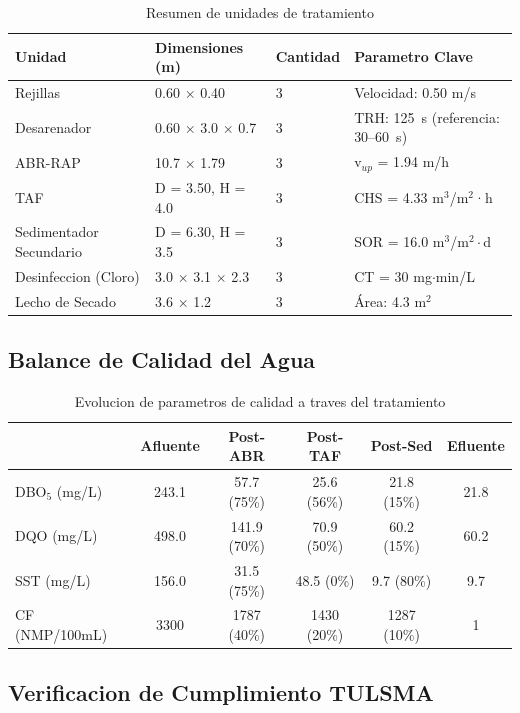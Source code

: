 \documentclass[12pt,a4paper]{article}
\begin{document}
\begin{table}[H]
\centering
\caption{Resumen de unidades de tratamiento}
\small
\begin{tabular}{p{3.2cm}p{3.5cm}p{1.5cm}p{4.8cm}}
\toprule
\textbf{Unidad} & \textbf{Dimensiones (m)} & \textbf{Cantidad} & \textbf{Parametro Clave} \\
\midrule
Rejillas & 0.60 $\times$ 0.40 & 3 & Velocidad: 0.50 m/s \\
Desarenador & 0.60 $\times$ 3.0 $\times$ 0.7 & 3 & TRH: 125~s (referencia: 30--60~s) \\
ABR-RAP & 10.7 $\times$ 1.79 & 3 & v$_{up}$ = 1.94 m/h \\
TAF & D = 3.50, H = 4.0 & 3 & CHS = 4.33 m$^3$/m$^2$·h \\
Sedimentador Secundario & D = 6.30, H = 3.5 & 3 & SOR = 16.0 m$^3$/m$^2\cdot$d \\
Desinfeccion (Cloro) & 3.0 $\times$ 3.1 $\times$ 2.3 & 3 & CT = 30 mg$\cdot$min/L \\
Lecho de Secado & 3.6 $\times$ 1.2 & 3 & Área: 4.3 m$^2$ \\
\bottomrule
\end{tabular}
\end{table}

\subsection{Balance de Calidad del Agua}

\begin{table}[H]
\centering
\caption{Evolucion de parametros de calidad a traves del tratamiento}
\begin{tabular}{lccccc}
\toprule
\textbf{} & \textbf{Afluente} & \textbf{Post-ABR} & \textbf{Post-TAF} & \textbf{Post-Sed} & \textbf{Efluente} \\
\midrule
DBO$_5$ (mg/L) & 243.1 & 57.7 (75\%) & 25.6 (56\%) & 21.8 (15\%) & 21.8 \\
DQO (mg/L) & 498.0 & 141.9 (70\%) & 70.9 (50\%) & 60.2 (15\%) & 60.2 \\
SST (mg/L) & 156.0 & 31.5 (75\%) & 48.5 (0\%) & 9.7 (80\%) & 9.7 \\
CF (NMP/100mL) & 3300 & 1787 (40\%) & 1430 (20\%) & 1287 (10\%) & 1 \\
\bottomrule
\end{tabular}
\end{table}

\subsection{Verificacion de Cumplimiento TULSMA}
\end{document}
